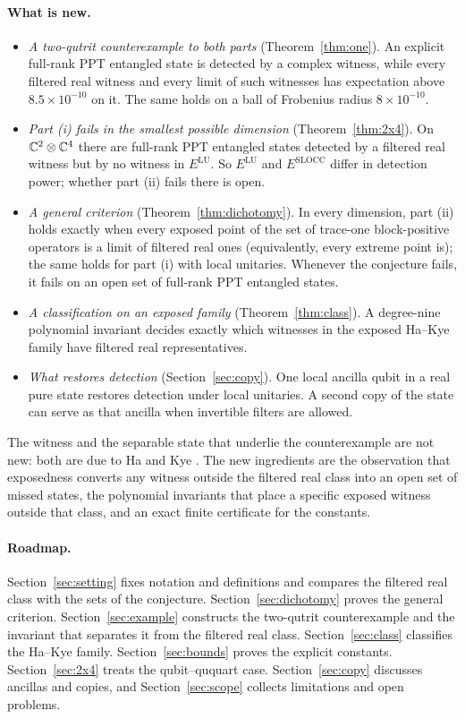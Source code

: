 \documentclass[11pt,a4paper]{article}
\theoremstyle{definition}\newtheorem{definition}[theorem]{Definition}\newtheorem*{conj}{Conjecture 9 of Shen, Chen and Bian}\newtheorem{remark}[theorem]{Remark}
\begin{document}
\paragraph{What is new.}
\begin{itemize}
\item \emph{A two-qutrit counterexample to both parts} (Theorem~\ref{thm:one}). An explicit full-rank PPT entangled state is detected by a complex witness, while every filtered real witness and every limit of such witnesses has expectation above $8.5\times10^{-10}$ on it. The same holds on a ball of Frobenius radius $8\times10^{-10}$.
\item \emph{Part (i) fails in the smallest possible dimension} (Theorem~\ref{thm:2x4}). On $\mathbb C^2\otimes\mathbb C^4$ there are full-rank PPT entangled states detected by a filtered real witness but by no witness in $E^{\mathrm{LU}}$. So $E^{\mathrm{LU}}$ and $E^{\mathrm{SLOCC}}$ differ in detection power; whether part (ii) fails there is open.
\item \emph{A general criterion} (Theorem~\ref{thm:dichotomy}). In every dimension, part (ii) holds exactly when every exposed point of the set of trace-one block-positive operators is a limit of filtered real ones (equivalently, every extreme point is); the same holds for part (i) with local unitaries. Whenever the conjecture fails, it fails on an open set of full-rank PPT entangled states.
\item \emph{A classification on an exposed family} (Theorem~\ref{thm:class}). A degree-nine polynomial invariant decides exactly which witnesses in the exposed Ha--Kye family \cite{hakye} have filtered real representatives.
\item \emph{What restores detection} (Section~\ref{sec:copy}). One local ancilla qubit in a real pure state restores detection under local unitaries. A second copy of the state can serve as that ancilla when invertible filters are allowed.
\end{itemize}
The witness and the separable state that underlie the counterexample are not new: both are due to Ha and Kye \cite{hakye,hk12}. The new ingredients are the observation that exposedness converts any witness outside the filtered real class into an open set of missed states, the polynomial invariants that place a specific exposed witness outside that class, and an exact finite certificate for the constants.

\paragraph{Roadmap.}
Section~\ref{sec:setting} fixes notation and definitions and compares the filtered real class with the sets of the conjecture. Section~\ref{sec:dichotomy} proves the general criterion. Section~\ref{sec:example} constructs the two-qutrit counterexample and the invariant that separates it from the filtered real class. Section~\ref{sec:class} classifies the Ha--Kye family. Section~\ref{sec:bounds} proves the explicit constants. Section~\ref{sec:2x4} treats the qubit--ququart case. Section~\ref{sec:copy} discusses ancillas and copies, and Section~\ref{sec:scope} collects limitations and open problems.
\end{document}
